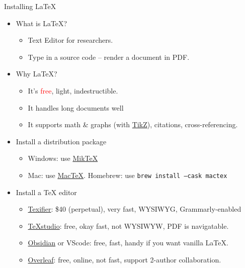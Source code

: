 \documentclass[
11pt, %
]{beamer}
\newcommand{\red}[1]{\textcolor{red}{#1}}
\begin{document}
	
	\begin{frame}{Installing \LaTeX}
		\begin{itemize}
			\item What is \LaTeX?
			\begin{itemize}
				\item Text Editor for researchers.
				\item Type in a source code -- render a document in PDF.
			\end{itemize}
			\item Why \LaTeX ?
			\begin{itemize}
				\item It's \red{free}, light, indestructible.
				\item It handles long documents well
				\item It supports math \& graphs (with \href{https://www.overleaf.com/learn/latex/LaTeX_Graphics_using_TikZ\%3A_A_Tutorial_for_Beginners_(Part_1)\%E2\%80\%94Basic_Drawing}{TikZ}), citations, cross-referencing.
			\end{itemize}
			\item Install a distribution package
			\begin{itemize}
				\item Windows: use \href{https://miktex.org/download}{MikTeX}
				\item Mac: use \href{https://www.tug.org/mactex/}{MacTeX}. Homebrew: use \texttt{brew install --cask mactex}
			\end{itemize}
			\item Install a TeX editor
			\begin{itemize}
				\item \href{https://www.texifier.com/}{Texifier}: \$40 (perpetual), very fast, WYSIWYG, Grammarly-enabled
				\item \href{https://www.texstudio.org/}{TeXstudio}: free, okay fast, not WYSIWYW, PDF is navigatable.
				\item \href{https://obsidian.md/}{Obsidian} or VScode: free, fast, handy if you want vanilla \LaTeX.
				\item \href{https://www.overleaf.com/}{Overleaf}: free, online, not fast, support 2-author collaboration.
			\end{itemize}
		\end{itemize}
	\end{frame}
	
\end{document}
